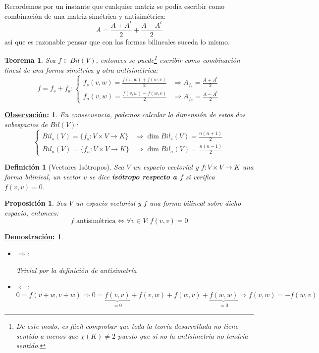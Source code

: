 \documentclass[10pt,a4paper,openright]{book}
\theoremstyle{break}
\newtheorem*{defi}{Definición}
\newtheorem*{theo}{Teorema}
\newtheorem*{prop}{Proposición}
\newtheorem*{demo}{\underline{Demostración}:}
\newtheorem*{obs}{\underline{Observación}:}
\begin{document}
Recordemos por un instante que cualquier matriz se podía escribir como combinación de una matriz simétrica y antisimétrica:
$$A=\frac{A+A^t}{2}+\frac{A-A^t}{2}$$
así que es razonable pensar que con las formas bilineales suceda lo mismo.

\begin{theo}
Sea $f\in Bil(V)$, entonces se puede\footnote{De este modo, es fácil comprobar que toda la teoría desarrollada no tiene sentido a menos que $\chi(K)\neq 2$ puesto que si no la antisimetría no tendría sentido.} escribir como combinación lineal de una forma simétrica y otra antisimétrica:
$$f=f_s+f_a: \begin{cases} f_s(v,w)=\frac{f(v,w)+f(w,v)}{2}& \Rightarrow A_{f_s} = \frac{A+A^t}{2} \\ f_a(v,w)=\frac{f(v,w)-f(w,v)}{2} &\Rightarrow A_{f_a} = \frac{A-A^t}{2} \end{cases}$$
\end{theo}

\begin{obs}
En consecuencia, podemos calcular la dimensión de estos dos subespacios de $Bil(V)$:
$$\begin{cases}Bil_s(V)=\{f_s: V\times V\rightarrow K\} &\Rightarrow \dim Bil_s(V)=\frac{n(n+1)}{2} \\ Bil_a(V)=\{f_a: V\times V\rightarrow K\} &\Rightarrow \dim Bil_a(V)=\frac{n(n-1)}{2}\end{cases}$$
\end{obs}


\begin{defi}[Vectores Isótropos]
Sea $V$ un espacio vectorial y $f:V \times V \rightarrow K$ una forma bilinieal, un vector $v$ se dice \textbf{isótropo respecto a $f$} si verifica $f(v,v)=0$.
\end{defi}

\begin{prop}
Sea $V$ un espacio vectorial y $f$ una forma bilineal sobre dicho espacio, entonces:
$$f \mbox{ antisimétrica} \Leftrightarrow \forall v\in V: f(v,v)=0$$
\end{prop}
\begin{demo}
\begin{itemize}
\item $\Rightarrow$:

Trivial por la definición de antisimetría

\item $\Leftarrow$:
$$0= f(v+w, v+w)\Rightarrow 0= \underbrace{f(v,v)}_{=0}+ f(v,w)+ f(w,v)+ \underbrace{f(w,w)}_{=0}\Rightarrow f(v,w)= - f(w,v)$$
\end{itemize}
\end{demo}
\end{document}
